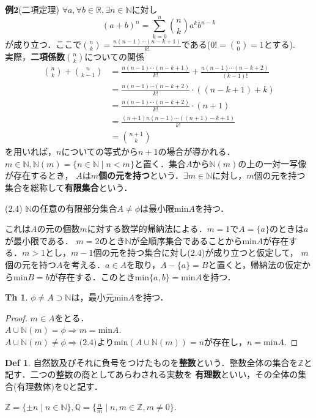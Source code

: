 \documentclass{ltjsarticle}
\theoremstyle{definition}
\newtheorem{thm}{Th}[subsection]
\newtheorem{definition}{Def}[subsection]
\theoremstyle{propcorollarystyle}
\theoremstyle{thmcorollarystyle}
\begin{document}
\textbf{例2}(二項定理) $\forall a,\forall b \in \mathbb{R},\exists n \in \mathbb{N}$に対し
 \[
 (a+b)^n=\sum_{k=0}^{n}\binom{n}{k}a^k b^{n-k}
 \]
 が成り立つ．ここで$\binom{n}{k}=\frac{n(n-1)\cdots (n-k+1)}{k!}$である($0!=\binom{n}{0}=1$とする).\\
実際，\textbf{二項係数}$\binom{n}{k}$についての関係
\begin{align*}
  \binom{n}{k}+\binom{n}{k-1}&=\frac{n(n-1)\cdots (n-k+1)}{k!}+\frac{n(n-1)\cdots (n-k+2)}{(k-1)!}\\
  &=\frac{n(n-1)\cdots (n-k+2)}{k!}\cdot ((n-k+1)+k)\\
  &=\frac{n(n-1)\cdots (n-k+2)}{k!}\cdot (n+1)\\
  &=\frac{(n+1)n(n-1)\cdots ((n+1)-k+1)}{k!}\\
  &=\binom{n+1}{k}
\end{align*}
を用いれば，$n$についての等式から$n+1$の場合が導かれる．\\

$m \in \mathbb{N}, \mathbb{N}(m)=\{n \in \mathbb{N} \mid n<m\}$と置く．集合$A$から$\mathbb{N}(m)$の上の一対一写像が存在するとき，
$A$は\textbf{$m$個の元を持つ}という．$\exists m \in \mathbb{N}$に対し，$m$個の元を持つ集合を総称して\textbf{有限集合}という．

(2.4) $\mathbb{N}$の任意の有限部分集合$A \neq \phi$は最小限$\text{min}A$を持つ．

これは$A$の元の個数$m$に対する数学的帰納法による．$m=1でA=\{a\}$のときは$a$が最小限である．
$m=2$のとき$\mathbb{N}$が全順序集合であることから$\text{min}A$が存在する．$m>1とし，m-1$個の元を持つ集合に対し(2.4)が成り立つと仮定して，
$m$個の元を持つ$A$を考える．$a \in A$を取り，$A-\{a\}=B$と置くと，帰納法の仮定から$\text{min}B=b$が存在する．このとき$\text{min}\{a,b\}=\text{min}A$を持つ．

\begin{thm}
  $\phi \neq A \supset \mathbb{N}$は，最小元$\text{min}A$を持つ．
\end{thm}
\begin{proof}
  $m \in A$をとる．\\
  $A \cup \mathbb{N}(m) = \phi \Rightarrow m=\text{min}A$.\\
  $A \cup \mathbb{N}(m) \neq \phi \Rightarrow \text{(2.4)より} \text{min}(A \cup \mathbb{N}(m))=n$が存在し，$n=\text{min}A$.
\end{proof}

\begin{definition}
  自然数及びそれに負号をつけたものを\textbf{整数}という．整数全体の集合を$\mathbb{Z}$と記す．二つの整数の商としてあらわされる実数を
  \textbf{有理数}といい，その全体の集合(有理数体)を$\mathbb{Q}$と記す．
\end{definition}
$\mathbb{Z}=\{\pm n \mid n \in \mathbb{N}\}, \mathbb{Q}=\{\frac{n}{m} \mid n,m \in \mathbb{Z},m \neq 0\}.$
\end{document}

